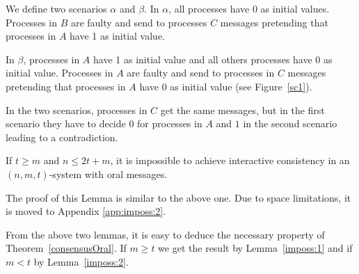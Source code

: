   We define two scenarios $\alpha$ and $\beta$.
  In $\alpha$, all processes have 0 as initial values.
  Processes in $B$ are faulty and send  to processes $C$ messages
  pretending that processes in $A$ have 1 as initial value.
  
  In $\beta$, processes in $A$ have 1 as initial value and all  others processes have 0 as initial value.
  Processes in $A$ are faulty and send to processes in $C$ messages 
  pretending that processes in $A$ have 0 as initial value (see Figure~\ref{sc1}).
  
  In the two scenarios, processes in $C$ get the same messages, but in the first scenario 
  they have to decide 0 for processes in $A$ and $1$ in the second scenario leading to a contradiction.


\begin{lemma}\label{imposs:2}
  If $t \geqslant m$ and $n \leqslant 2t+m$, it is impossible to achieve interactive consistency in an $(n,m,t)$-system with oral messages.\end{lemma}

The proof of this Lemma is similar to the above one. Due to space limitations, it is moved to Appendix \ref{app:imposs:2}.

From the above two lemmas, it is easy to deduce the necessary property of 
Theorem~\ref{consensusOral}. 
If $m \geqslant t$ we get the result by Lemma~\ref{imposs:1} and  if $m<t$ by Lemma~\ref{imposs:2}.





